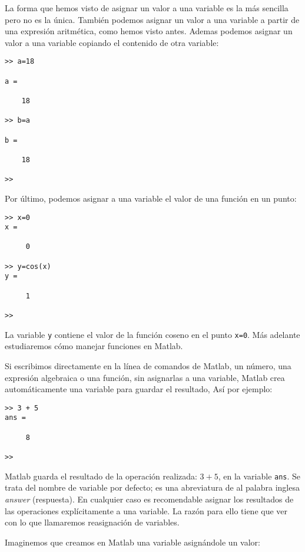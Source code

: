  La forma que hemos visto de asignar un valor a una variable es la más sencilla pero no es la única. También podemos asignar un valor a una variable a partir de una expresión aritmética, como hemos visto antes. Ademas podemos asignar un valor a una variable copiando el contenido de otra variable:
\begin{verbatim}
>> a=18

a =

    18

>> b=a

b =

    18

>> 
\end{verbatim}
Por último, podemos asignar a una variable el valor de una función en un punto:
\begin{verbatim}
>> x=0
x =

     0

>> y=cos(x)
y =

     1

>> 
\end{verbatim}

La variable \texttt{y} contiene el valor de la función coseno en el punto \texttt{x=0}. Más adelante estudiaremos cómo manejar funciones en Matlab. 

Si escribimos directamente en la línea de comandos de Matlab, un número, una expresión algebraica o una función, sin asignarlas a una variable, Matlab crea automáticamente una variable para guardar el resultado, Así por ejemplo:
\begin{verbatim}
>> 3 + 5
ans =

     8

>> 
\end{verbatim}
Matlab guarda el resultado de la operación realizada: $3+5$, en la variable \texttt{ans}.  Se trata del nombre de variable por defecto; es una abreviatura de al palabra inglesa \emph{answer} (respuesta).  En cualquier caso es recomendable asignar los resultados de las operaciones explícitamente a una variable.  La razón para ello tiene que ver con lo que llamaremos reasignación de variables.

Imaginemos que creamos en Matlab una variable asignándole un valor:

